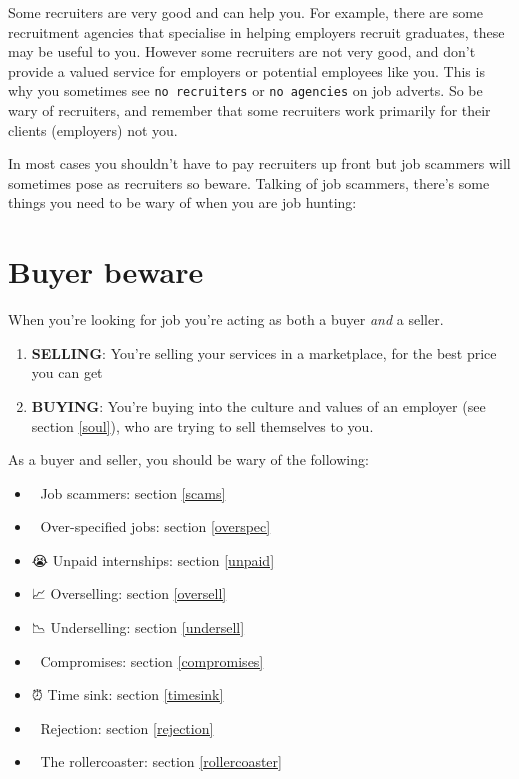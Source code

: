 \documentclass[
]{book}
\providecommand{\tightlist}{%
  \setlength{\itemsep}{0pt}\setlength{\parskip}{0pt}}
\begin{document}
Some recruiters are very good and can help you. For example, there are some recruitment agencies that specialise in helping employers recruit graduates, these may be useful to you. However some recruiters are not very good, and don't provide a valued service for employers or potential employees like you. This is why you sometimes see \texttt{no\ recruiters} or \texttt{no\ agencies} on job adverts. So be wary of recruiters, and remember that some recruiters work primarily for their clients (employers) not you.

In most cases you shouldn't have to pay recruiters up front but job scammers will sometimes pose as recruiters so beware. Talking of job scammers, there's some things you need to be wary of when you are job hunting:

\hypertarget{beware}{%
\section{Buyer beware}\label{beware}}

When you're looking for job you're acting as both a buyer \emph{and} a seller.

\begin{enumerate}
\def\labelenumi{\arabic{enumi}.}
\tightlist
\item
  \textbf{SELLING}: You're selling your services in a marketplace, for the best price you can get
\item
  \textbf{BUYING}: You're buying into the culture and values of an employer (see section \ref{soul}), who are trying to sell themselves to you.
\end{enumerate}

As a buyer and seller, you should be wary of the following:

\begin{itemize}
\tightlist
\item
  🤥 Job scammers: section \ref{scams}
\item
  🤣 Over-specified jobs: section \ref{overspec}
\item
  😭 Unpaid internships: section \ref{unpaid}
\item
  📈 Overselling: section \ref{oversell}
\item
  📉 Underselling: section \ref{undersell}
\item
  🤔 Compromises: section \ref{compromises}
\item
  ⏰ Time sink: section \ref{timesink}
\item
  🤮 Rejection: section \ref{rejection}
\item
  🎢 The rollercoaster: section \ref{rollercoaster}
\end{itemize}
\end{document}

